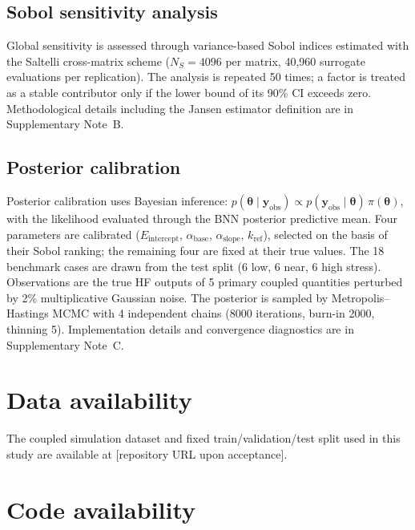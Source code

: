 \documentclass[11pt,a4paper]{article}
\newcommand{\Eint}{\ensuremath{E_{\mathrm{intercept}}}}
\newcommand{\abase}{\ensuremath{\alpha_{\mathrm{base}}}}
\newcommand{\aslope}{\ensuremath{\alpha_{\mathrm{slope}}}}
\newcommand{\kref}{\ensuremath{k_{\mathrm{ref}}}}
\begin{document}
\subsection{Sobol sensitivity analysis}

Global sensitivity is assessed through variance-based Sobol indices
estimated with the Saltelli cross-matrix scheme ($N_S = 4096$ per
matrix, 40,960 surrogate evaluations per replication). The analysis is
repeated 50 times; a factor is treated as a stable contributor only if
the lower bound of its 90\% CI exceeds zero. Methodological details
including the Jansen estimator definition are in Supplementary Note~B.

\subsection{Posterior calibration}

Posterior calibration uses Bayesian inference:
$p(\boldsymbol{\theta} \mid \mathbf{y}_{\mathrm{obs}}) \propto
p(\mathbf{y}_{\mathrm{obs}} \mid \boldsymbol{\theta})\,
\pi(\boldsymbol{\theta})$, with the likelihood evaluated through the BNN
posterior predictive mean. Four parameters are calibrated (\Eint{},
\abase{}, \aslope{}, \kref{}), selected on the basis of their Sobol
ranking; the remaining four are fixed at their true values. The 18
benchmark cases are drawn from the test split (6 low, 6 near, 6 high
stress). Observations are the true HF outputs of 5 primary coupled
quantities perturbed by 2\% multiplicative Gaussian noise. The posterior
is sampled by Metropolis--Hastings MCMC with 4 independent chains (8000
iterations, burn-in 2000, thinning 5). Implementation details and
convergence diagnostics are in Supplementary Note~C.

\section*{Data availability}

The coupled simulation dataset and fixed train/validation/test split
used in this study are available at [repository URL upon acceptance].

\section*{Code availability}
\end{document}

